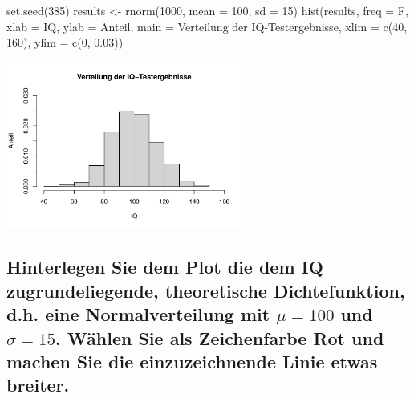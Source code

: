 \documentclass[12pt,a4paper]{article}
\newenvironment{Shaded}{\begin{snugshade}}{\end{snugshade}}
\newcommand{\AttributeTok}[1]{\textcolor[rgb]{0.77,0.63,0.00}{#1}}
\newcommand{\DecValTok}[1]{\textcolor[rgb]{0.00,0.00,0.81}{#1}}
\newcommand{\FloatTok}[1]{\textcolor[rgb]{0.00,0.00,0.81}{#1}}
\newcommand{\FunctionTok}[1]{\textcolor[rgb]{0.00,0.00,0.00}{#1}}
\newcommand{\NormalTok}[1]{#1}
\newcommand{\OtherTok}[1]{\textcolor[rgb]{0.56,0.35,0.01}{#1}}
\newcommand{\StringTok}[1]{\textcolor[rgb]{0.31,0.60,0.02}{#1}}
\begin{document}
\begin{Shaded}
\begin{Highlighting}[]
    \FunctionTok{set.seed}\NormalTok{(}\DecValTok{385}\NormalTok{)}
\NormalTok{    results }\OtherTok{\textless{}{-}} \FunctionTok{rnorm}\NormalTok{(}\DecValTok{1000}\NormalTok{, }\AttributeTok{mean =} \DecValTok{100}\NormalTok{, }\AttributeTok{sd =} \DecValTok{15}\NormalTok{)}
    \FunctionTok{hist}\NormalTok{(results, }
         \AttributeTok{freq =}\NormalTok{ F,}
         \AttributeTok{xlab =} \StringTok{\textquotesingle{}IQ\textquotesingle{}}\NormalTok{, }
         \AttributeTok{ylab =} \StringTok{\textquotesingle{}Anteil\textquotesingle{}}\NormalTok{, }
         \AttributeTok{main =} \StringTok{\textquotesingle{}Verteilung der IQ{-}Testergebnisse\textquotesingle{}}\NormalTok{, }
         \AttributeTok{xlim =} \FunctionTok{c}\NormalTok{(}\DecValTok{40}\NormalTok{, }\DecValTok{160}\NormalTok{), }
         \AttributeTok{ylim =} \FunctionTok{c}\NormalTok{(}\DecValTok{0}\NormalTok{, }\FloatTok{0.03}\NormalTok{))}
\end{Highlighting}
\end{Shaded}

\begin{center}\includegraphics[width=300px]{solution_3_files/figure-latex/unnamed-chunk-12-1} \end{center}

\hypertarget{hinterlegen-sie-dem-plot-die-dem-iq-zugrundeliegende-theoretische-dichtefunktion-d.h.-eine-normalverteilung-mit-mu100-und-sigma15.-wuxe4hlen-sie-als-zeichenfarbe-rot-und-machen-sie-die-einzuzeichnende-linie-etwas-breiter.}{%
\subsection{\texorpdfstring{Hinterlegen Sie dem Plot die dem IQ
zugrundeliegende, theoretische Dichtefunktion, d.h. eine
Normalverteilung mit \(\mu=100\) und \(\sigma=15\). Wählen Sie als
Zeichenfarbe Rot und machen Sie die einzuzeichnende Linie etwas
breiter.}{Hinterlegen Sie dem Plot die dem IQ zugrundeliegende, theoretische Dichtefunktion, d.h. eine Normalverteilung mit \textbackslash mu=100 und \textbackslash sigma=15. Wählen Sie als Zeichenfarbe Rot und machen Sie die einzuzeichnende Linie etwas breiter.}}\label{hinterlegen-sie-dem-plot-die-dem-iq-zugrundeliegende-theoretische-dichtefunktion-d.h.-eine-normalverteilung-mit-mu100-und-sigma15.-wuxe4hlen-sie-als-zeichenfarbe-rot-und-machen-sie-die-einzuzeichnende-linie-etwas-breiter.}}
\end{document}
